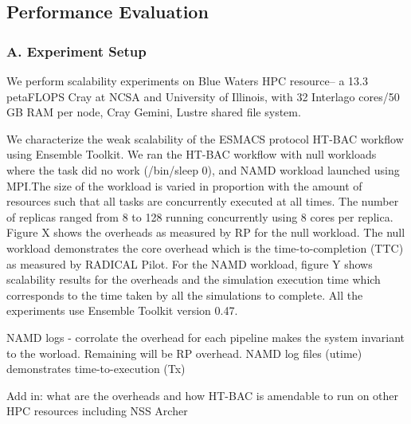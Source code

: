 \subsection{Performance Evaluation}

\subsubsection{A. Experiment Setup}

We perform scalability experiments on Blue Waters HPC resource-- a 13.3 petaFLOPS Cray at NCSA and University of Illinois, with 32 Interlago cores/50 GB RAM per node, Cray Gemini, Lustre shared file system. 

We characterize the weak scalability of the ESMACS protocol HT-BAC workflow using Ensemble Toolkit. We ran the HT-BAC workflow with null workloads where the task did no work (/bin/sleep 0), and NAMD workload launched using MPI.The size of the workload is varied in proportion with the amount of resources such that all tasks are concurrently executed at all times. The number of replicas ranged from 8 to 128 running concurrently using 8 cores per replica. Figure X shows the overheads as measured by RP for the null workload. The null workload demonstrates the core overhead which is the time-to-completion (TTC) as measured by RADICAL Pilot. For the NAMD workload, figure Y shows scalability results for the overheads and the simulation execution time which corresponds to the time taken by all the simulations to complete. All the experiments use Ensemble Toolkit version 0.47. 

NAMD logs - corrolate the overhead for each pipeline makes the system invariant to the worload. Remaining will be RP overhead. NAMD log files (utime) demonstrates time-to-execution (Tx) 

Add in: what are the overheads and how HT-BAC is amendable to run on other HPC resources including NSS Archer 



